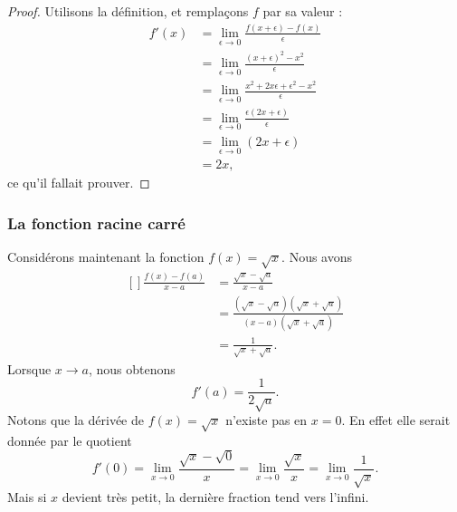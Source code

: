 \begin{proof}
	Utilisons la définition, et remplaçons \( f\) par sa valeur :
	\begin{subequations}
		\begin{align}
			f'(x) & =\lim_{\epsilon\to 0}\frac{ f(x+\epsilon)-f(x) }{ \epsilon }            \\
			      & =\lim_{\epsilon\to 0}\frac{ (x+\epsilon)^2-x^2 }{ \epsilon }            \\
			      & =\lim_{\epsilon\to 0}\frac{ x^2+2x\epsilon+\epsilon^2-x^2 }{ \epsilon } \\
			      & =\lim_{\epsilon\to 0}\frac{\epsilon(2x+\epsilon)}{ \epsilon }           \\
			      & =\lim_{\epsilon\to 0}(2x+\epsilon)                                      \\
			      & =2x,
		\end{align}
	\end{subequations}
	ce qu'il fallait prouver.
\end{proof}


\subsubsection{La fonction racine carré}

Considérons maintenant la fonction \( f(x)=\sqrt{x}\). Nous avons
\begin{equation}
	\begin{aligned}[]
		\frac{ f(x)-f(a) }{ x-a } & =\frac{ \sqrt{x}-\sqrt{a} }{ x-a }                                           \\
		                          & =\frac{ (\sqrt{x}-\sqrt{a})(\sqrt{x}+\sqrt{a}) }{ (x-a)(\sqrt{x}+\sqrt{a}) } \\
		                          & =\frac{1}{ \sqrt{x}+\sqrt{a} }.
	\end{aligned}
\end{equation}
Lorsque \( x\to a\), nous obtenons
\begin{equation}
	f'(a)=\frac{1}{ 2\sqrt{a} }.
\end{equation}
Notons que la dérivée de \( f(x)=\sqrt{x}\) n'existe pas en \( x=0\). En effet elle serait donnée par le quotient
\begin{equation}
	f'(0)=\lim_{x\to 0} \frac{ \sqrt{x}-\sqrt{0} }{ x }=\lim_{x\to 0} \frac{ \sqrt{x} }{ x }=\lim_{x\to 0} \frac{1}{ \sqrt{x} }.
\end{equation}
Mais si \( x\) devient très petit, la dernière fraction tend vers l'infini.


